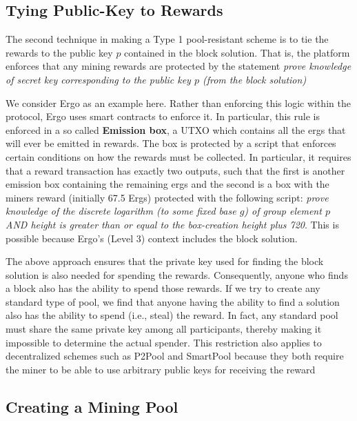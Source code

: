 \documentclass[11pt]{article}
\begin{document}

\subsection{Tying Public-Key to Rewards}

The second technique in making a Type 1 pool-resistant scheme is to tie the rewards to the public key $p$ contained in the block solution. That is, the platform enforces that any mining rewards are protected by the statement {\em prove knowledge of secret key corresponding to the public key $p$ (from the block solution)}

We consider Ergo as an example here. Rather than enforcing this logic within the protocol, Ergo uses smart contracts to enforce it. In particular, this rule is enforced in a so called \textbf{Emission box}, a UTXO which contains all the ergs that will ever be emitted in rewards. The box is protected by a script that enforces certain conditions on how the rewards must be collected. In particular, it requires that a reward transaction has exactly two outputs, such that the first is another emission box containing the remaining ergs and the second is a box with the miners reward (initially 67.5 Ergs) protected with the following script: {\em prove knowledge of the discrete logarithm (to some fixed base $g$) of group element $p$ AND height is greater than or equal to the box-creation height plus 720}.
This is possible because Ergo's (Level 3) context includes the block solution.  

The above approach ensures that the private key used for finding the block solution is also needed for spending the rewards. Consequently, anyone who finds a block also has the ability to spend those rewards. 
If we try to create any standard type of pool, we find that anyone having the ability to find a solution also has the ability to spend (i.e., steal) the reward. In fact, any standard pool must share the same private key among all participants, thereby making it impossible to determine the actual spender. This restriction also applies to decentralized schemes such as P2Pool and SmartPool because they both require the miner to be able to use arbitrary public keys for receiving the reward

\subsection{Creating a Mining Pool}
\end{document}
